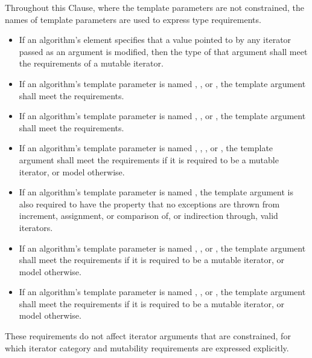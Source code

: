 \pnum
Throughout this Clause, where the template parameters are not constrained,
the names of template parameters are used to express type requirements.
\begin{itemize}
\item
  If an algorithm's  element specifies
  that a value pointed to by any iterator passed as an argument is modified,
  then the type of that argument shall meet
  the requirements of a mutable iterator.
\item
  If an algorithm's template parameter is named
  ,
  , or
  ,
  the template argument shall meet the
   requirements.
\item
  If an algorithm's template parameter is named
  ,
  , or
  ,
  the template argument shall meet the
   requirements.
\item
  If an algorithm's template parameter is named
  ,
  ,
  , or
  ,
  the template argument shall meet the
   requirements
  if it is required to be a mutable iterator, or
  model  otherwise.
\item
  If an algorithm's template parameter is named
  ,
  the template argument
  is also required to have the property that no exceptions are thrown
  from increment, assignment, or comparison of, or
  indirection through, valid iterators.
\item
  If an algorithm's template parameter is named
  ,
  , or
  ,
  the template argument shall meet the
   requirements
  if it is required to be a mutable iterator, or model
   otherwise.
\item
  If an algorithm's template parameter is named
  ,
  , or
  ,
  the template argument shall meet the
   requirements
  if it is required to be a mutable iterator, or model
   otherwise.
\end{itemize}
\begin{note}
These requirements do not affect iterator arguments that are constrained,
for which iterator category and mutability requirements
are expressed explicitly.
\end{note}

